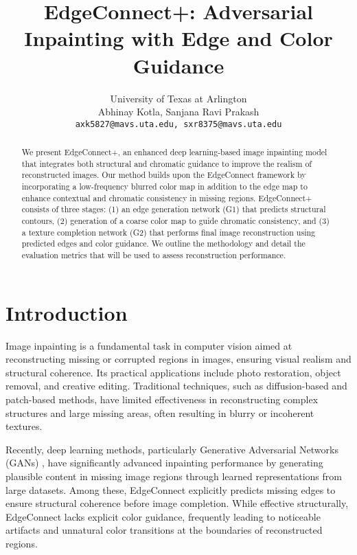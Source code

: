 \documentclass[10pt,twocolumn,letterpaper]{article}
\begin{document}
\title{EdgeConnect+: Adversarial Inpainting with Edge and Color Guidance}

\author{
University of Texas at Arlington\\
Abhinay Kotla, Sanjana Ravi Prakash\\
{\tt\small axk5827@mavs.uta.edu, sxr8375@mavs.uta.edu}
}

\maketitle
\thispagestyle{empty}

\begin{abstract}
We present EdgeConnect+, an enhanced deep learning-based image inpainting model that integrates both structural and chromatic guidance to improve the realism of reconstructed images. Our method builds upon the EdgeConnect framework by incorporating a low-frequency blurred color map in addition to the edge map to enhance contextual and chromatic consistency in missing regions. EdgeConnect+ consists of three stages: (1) an edge generation network (G1) that predicts structural contours, (2) generation of a coarse color map to guide chromatic consistency, and (3) a texture completion network (G2) that performs final image reconstruction using predicted edges and color guidance. We outline the methodology and detail the evaluation metrics that will be used to assess reconstruction performance.
\end{abstract}


\section{Introduction}

Image inpainting is a fundamental task in computer vision aimed at reconstructing missing or corrupted regions in images, ensuring visual realism and structural coherence. Its practical applications include photo restoration, object removal, and creative editing. Traditional techniques, such as diffusion-based and patch-based methods, have limited effectiveness in reconstructing complex structures and large missing areas, often resulting in blurry or incoherent textures.

Recently, deep learning methods, particularly Generative Adversarial Networks (GANs) \cite{goodfellow2014generative}, have significantly advanced inpainting performance by generating plausible content in missing image regions through learned representations from large datasets. Among these, EdgeConnect \cite{nazeri2019edgeconnect} explicitly predicts missing edges to ensure structural coherence before image completion. While effective structurally, EdgeConnect lacks explicit color guidance, frequently leading to noticeable artifacts and unnatural color transitions at the boundaries of reconstructed regions.
\end{document}
